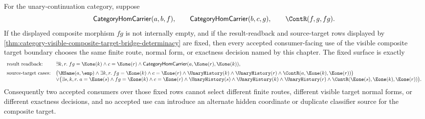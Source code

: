 \begin{corollary}
\label{cor:category-visible-composite-target-consumer-determinacy}
For the unary-continuation category, suppose
$$
\mathsf{CategoryHomCarrier}(a,b,f),\qquad
\mathsf{CategoryHomCarrier}(b,c,g),\qquad
\ContR(f,g,fg).
$$
If the displayed composite morphism $fg$ is not internally empty, and if the
result-readback and source-target rows displayed by
\autoref{thm:category-visible-composite-target-bridge-determinacy} are fixed,
then every accepted consumer-facing use of the visible composite target
boundary chooses the same finite route, normal form, or exactness decision named
by this chapter. The fixed surface is exactly
$$
\begin{array}{ll}
\text{result readback:} &
\exists k,r.\;fg=\Eone(k)\land c=\Eone(r)\land
\mathsf{CategoryHomCarrier}(a,\Eone(r),\Eone(k)),
\\[2mm]
\text{source-target cases:} &
\bigl(\HSame(a,\emp)\land
\exists k,r.\;fg=\Eone(k)\land c=\Eone(r)\land
\UnaryHistory(k)\land\UnaryHistory(r)\land
\ContR(a,\Eone(k),\Eone(r))\bigr)
\\
&\vee
\bigl(\exists s,k,r.\;a=\Eone(s)\land fg=\Eone(k)\land c=\Eone(r)\land
\UnaryHistory(s)\land\UnaryHistory(k)\land\UnaryHistory(r)\land
\ContR(\Eone(s),\Eone(k),\Eone(r))\bigr).
\end{array}
$$
Consequently two accepted consumers over those fixed rows cannot select
different finite routes, different visible target normal forms, or different
exactness decisions, and no accepted use can introduce an alternate hidden
coordinate or duplicate classifier source for the composite target.
\end{corollary}
